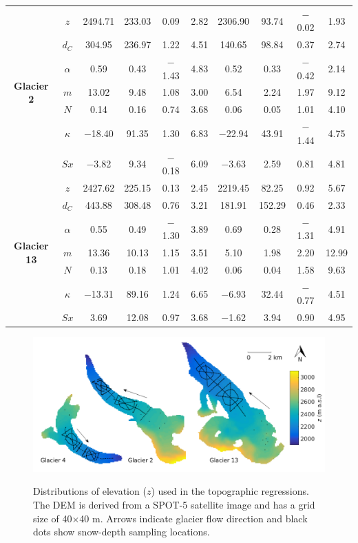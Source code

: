 \documentclass{sfuthesis}
\newcommand{\topomap}{Arrows indicate glacier flow direction and black dots show snow-depth sampling locations. }
\begin{document}
\begin{table}
\begin{tabular}{cc|cccc|cccc}
\multirow{7}{*}{\textbf{Glacier 2}} & $z$ & 2494.71 & 233.03 & 0.09 & 2.82 & 2306.90 & 93.74 & $-$0.02 & 1.93 \\
 & $d_C$ & 304.95 & 236.97 & 1.22 & 4.51 & 140.65 & 98.84 & 0.37 & 2.74 \\
 & $\alpha$ & 0.59 & 0.43 & $-$1.43 & 4.83 & 0.52 & 0.33 & $-$0.42 & 2.14 \\
 & $m$ & 13.02 & 9.48 & 1.08 & 3.00 & 6.54 & 2.24 & 1.97 & 9.12 \\
 & $N$ & 0.14 & 0.16 & 0.74 & 3.68 & 0.06 & 0.05 & 1.01 & 4.10 \\
 & $\kappa$ & $-$18.40 & 91.35 & 1.30 & 6.83 & $-$22.94 & 43.91 & $-$1.44 & 4.75 \\
 & $Sx$ & $-$3.82 & 9.34 & $-$0.18 & 6.09 & $-$3.63 & 2.59 & 0.81 & 4.81 \\ \hline
\multirow{7}{*}{\textbf{Glacier 13}} & $z$ & 2427.62 & 225.15 & 0.13 & 2.45 & 2219.45 & 82.25 & 0.92 & 5.67 \\
 & $d_C$ & 443.88 & 308.48 & 0.76 & 3.21 & 181.91 & 152.29 & 0.46 & 2.33 \\
 & $\alpha$ & 0.55 & 0.49 & $-$1.30 & 3.89 & 0.69 & 0.28 & $-$1.31 & 4.91 \\
 & $m$ & 13.36 & 10.13 & 1.15 & 3.51 & 5.10 & 1.98 & 2.20 & 12.99 \\
 & $N$ & 0.13 & 0.18 & 1.01 & 4.02 & 0.06 & 0.04 & 1.58 & 9.63 \\
 & $\kappa$ & $-$13.31 & 89.16 & 1.24 & 6.65 & $-$6.93 & 32.44 & $-$0.77 & 4.51 \\
 & $Sx$ & 3.69 & 12.08 & 0.97 & 3.68 & $-$1.62 & 3.94 & 0.90 & 4.95
\end{tabular}
\end{table}

\pagebreak
\begin{figure}[H]
	\centering
	\includegraphics[width = \textwidth]{Map_elevation.png}\\
	\caption[Distributions of elevation ($z$)]{Distributions of elevation ($z$) used in the topographic regressions. The DEM is derived from a SPOT-5 satellite image and has a grid size of 40$\times$40 m. \topomap}
	\label{map:elev}
\end{figure}
\end{document}
